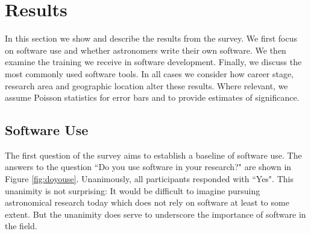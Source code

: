 \section{Results}
\label{sec:res}

In this section we show and describe the results from the survey. We first focus on software use and whether astronomers write their own software. We then examine the training we receive in software development. Finally, we discuss the most commonly used software tools. In all cases we consider how career stage, research area and geographic location alter these results. Where relevant, we assume Poisson statistics for error bars and to provide estimates of significance.

\subsection{Software Use}

The first question of the survey aims to establish a baseline of software use. The answers to the question ``Do you use software in your research?" are shown in Figure \ref{fig:doyouse}. Unanimously, all participants responded with ``Yes". This unanimity is not surprising: It would be difficult to imagine pursuing astronomical research today which does not rely on software at least to some extent. But the unanimity does serve to underscore the importance of software in the field.
    
    
  
